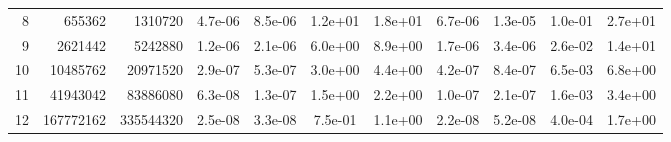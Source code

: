 \documentclass{seg}
\begin{document}
\begin{table}[h!]
\begin{tabular}{rrrcccccccc}
8   & 655362      & 1310720    & 4.7e-06 & 8.5e-06 & 1.2e+01 & 1.8e+01 & 6.7e-06 & 1.3e-05 & 1.0e-01 & 2.7e+01 \\
9   & 2621442     & 5242880    & 1.2e-06 & 2.1e-06 & 6.0e+00 & 8.9e+00 & 1.7e-06 & 3.4e-06 & 2.6e-02 & 1.4e+01 \\
10  & 10485762    & 20971520   & 2.9e-07 & 5.3e-07 & 3.0e+00 & 4.4e+00 & 4.2e-07 & 8.4e-07 & 6.5e-03 & 6.8e+00 \\
11  & 41943042    & 83886080   & 6.3e-08 & 1.3e-07 & 1.5e+00 & 2.2e+00 & 1.0e-07 & 2.1e-07 & 1.6e-03 & 3.4e+00 \\
12  & 167772162   & 335544320  & 2.5e-08 & 3.3e-08 & 7.5e-01 & 1.1e+00 & 2.2e-08 & 5.2e-08 & 4.0e-04 & 1.7e+00 \\
\bottomrule
\end{tabular}
\end{table}
\end{document}
